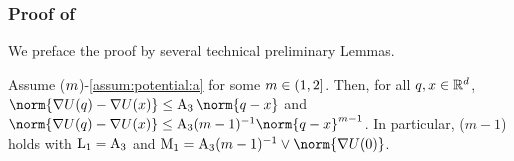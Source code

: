\subsubsection{Proof of }
\label{sec:proof-crefth}
We preface the proof by several technical preliminary Lemmas.


\begin{lemma}
\label{lem:grad_Lip_F}
Assume ($m$)-\ref{assum:potential:a} for some $m\in \left(1,2\right]$.
Then, for all $q,x \in \mathbb{R}^d$,
$\norm{\nabla \F(\q) - \nabla \F(\x)} \leq \constone  \norm{\q-\x}$
and $\norm{\nabla \F(\q) - \nabla \F(\x)} \leq \constone (m-1)^{-1} \norm{\q-\x}^{m-1}$.
In particular, ($m-1$) holds with $\mathrm{L}_1= \operatorname{A}_3$ and $\constzeroT= \constone (m-1)^{-1} \vee \norm{\nabla \F(0)}$.
\end{lemma}


